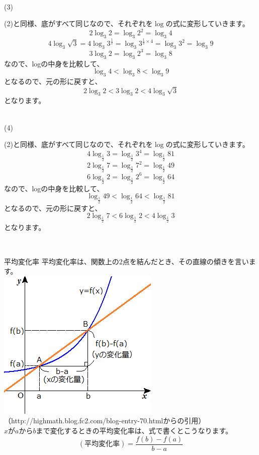 \documentclass{jsarticle}
\newenvironment{indentblock}{\begin{adjustwidth}{\parindent}{}\hspace{-\parindent}}{\end{adjustwidth}}
\begin{document}
\dotfill\\
(3)
\begin{indentblock}
(2)と同様、底がすべて同じなので、それぞれを$\log$の式に変形していきます。\\
\[2\log_3 2=\log_3 2^2=\log_3 4\]
\[4\log_3 \sqrt{3}=4\log_3 3^{\frac{1}{2}}=\log_3 3^{\frac{1}{2}\times 4}=\log_3 3^2=\log_3 9\]
\[3\log_3 2=\log_3 2^3=\log_3 8\]
なので、logの中身を比較して、
\[\log_3 4<\log_3 8<\log_3 9\]
となるので、元の形に戻すと、
\[2\log_3 2<3\log_3 2<4\log_3 \sqrt{3}\]
となります。
\end{indentblock}
\dotfill\\
(4)
\begin{indentblock}
(2)と同様、底がすべて同じなので、それぞれを$\log$の式に変形していきます。\\
\[4\log_{\frac{1}{2}} 3=\log_{\frac{1}{2}} 3^4=\log_{\frac{1}{2}} 81\]
\[2\log_{\frac{1}{2}} 7=\log_{\frac{1}{2}} 7^2=\log_{\frac{1}{2}} 49\]
\[6\log_{\frac{1}{2}} 2=\log_{\frac{1}{2}} 2^6=\log_{\frac{1}{2}} 64\]
なので、logの中身を比較して、
\[\log_{\frac{1}{2}} 49<\log_{\frac{1}{2}} 64<\log_{\frac{1}{2}} 81\]
となるので、元の形に戻すと、
\[2\log_{\frac{1}{2}} 7<6\log_{\frac{1}{2}} 2<4\log_{\frac{1}{2}} 3\]
となります。
\end{indentblock}
\hrulefill\\
\begin{itembox}[l]{平均変化率}
平均変化率は、関数上の2点を結んだとき、その直線の傾きを言います。\\
\includegraphics{20150726230645b0e.png}\\
\small{（http://highmath.blog.fc2.com/blog-entry-70.htmlからの引用）}\\
$x$が$a$から$b$まで変化するときの平均変化率は、式で書くとこうなります。\\
\[(平均変化率)=\frac{f(b)-f(a)}{b-a}\]
\end{itembox}
\end{document}
